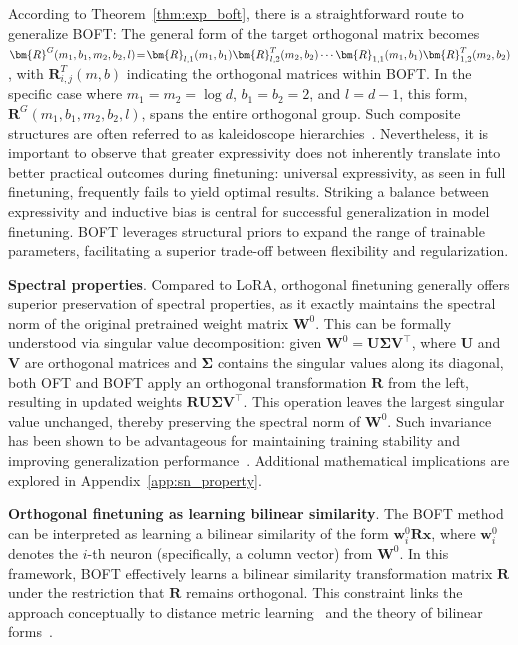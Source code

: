 According to Theorem~\ref{thm:exp_boft}, there is a straightforward route to generalize BOFT: The general form of the target orthogonal matrix becomes $\thickmuskip=2mu \medmuskip=2mu \bm{R}^G(m_1,b_1,m_2,b_2,l)=\bm{R}_{l,1}(m_1,b_1)\bm{R}_{l,2}^T(m_2,b_2)\cdots\bm{R}_{1,1}(m_1,b_1)\bm{R}_{1,2}^T(m_2,b_2)$, with $\bm{R}_{i,j}^T(m,b)$ indicating the orthogonal matrices within BOFT. In the specific case where $m_1=m_2=\log d$, $b_1=b_2=2$, and $l=d-1$, this form, $\bm{R}^G(m_1,b_1,m_2,b_2,l)$, spans the entire orthogonal group. Such composite structures are often referred to as kaleidoscope hierarchies~\cite{dao2019kaleidoscope}. Nevertheless, it is important to observe that greater expressivity does not inherently translate into better practical outcomes during finetuning: universal expressivity, as seen in full finetuning, frequently fails to yield optimal results. Striking a balance between expressivity and inductive bias is central for successful generalization in model finetuning. BOFT leverages structural priors to expand the range of trainable parameters, facilitating a superior trade-off between flexibility and regularization.

\textbf{Spectral properties}. Compared to LoRA, orthogonal finetuning generally offers superior preservation of spectral properties, as it exactly maintains the spectral norm of the original pretrained weight matrix $\bm{W}^0$. This can be formally understood via singular value decomposition: given $\bm{W}^0=\bm{U}\bm{\Sigma}\bm{V}^\top$, where $\bm{U}$ and $\bm{V}$ are orthogonal matrices and $\bm{\Sigma}$ contains the singular values along its diagonal, both OFT and BOFT apply an orthogonal transformation $\bm{R}$ from the left, resulting in updated weights $\bm{R}\bm{U}\bm{\Sigma}\bm{V}^\top$. This operation leaves the largest singular value unchanged, thereby preserving the spectral norm of $\bm{W}^0$. Such invariance has been shown to be advantageous for maintaining training stability and improving generalization performance~\cite{miyato2018spectral,yoshida2017spectral}. Additional mathematical implications are explored in Appendix~\ref{app:sn_property}.

\textbf{Orthogonal finetuning as learning bilinear similarity}. The BOFT method can be interpreted as learning a bilinear similarity of the form $\bm{w}^0_i\bm{R}\bm{x}$, where $\bm{w}^0_i$ denotes the $i$-th neuron (specifically, a column vector) from $\bm{W}^0$. In this framework, BOFT effectively learns a bilinear similarity transformation matrix $\bm{R}$ under the restriction that $\bm{R}$ remains orthogonal. This constraint links the approach conceptually to distance metric learning~\cite{xing2002distance} and the theory of bilinear forms~\cite{roman2005advanced}.

